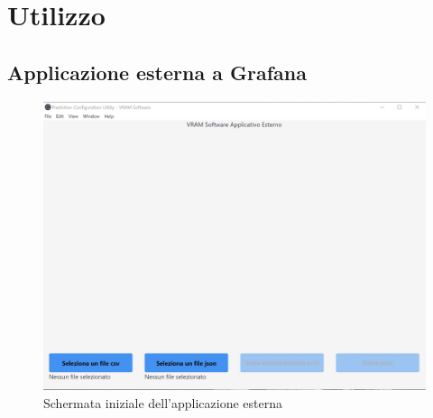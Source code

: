 \section{Utilizzo}
	\subsection{Applicazione esterna a Grafana}
		\mbox{}
		\begin{figure} [H]
			\begin{center}
				\includegraphics[width=\linewidth]{./img/1.jpg}
			\end{center}
			\caption{Schermata iniziale dell'applicazione esterna}
		\end{figure}
		\mbox{}
